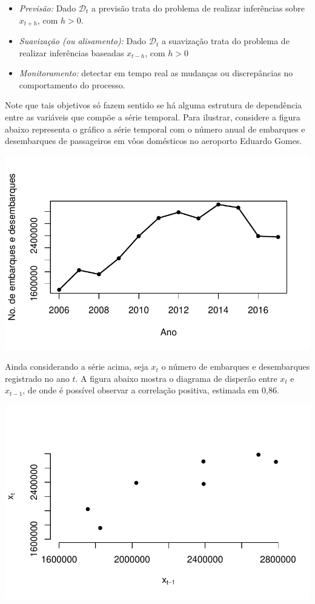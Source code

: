 \documentclass[
  letterpaper,
  DIV=11,
  numbers=noendperiod]{scrreprt}
\theoremstyle{definition}
\theoremstyle{plain}
\theoremstyle{definition}
\theoremstyle{plain}
\theoremstyle{remark}
\begin{document}
\begin{itemize}
\item
  \emph{Previsão:} Dado \(\mathcal{D}_t\) a previsão trata do problema
  de realizar inferências sobre \(x_{t+h}\), com \(h>0\).
\item
  \emph{Suavização (ou alisamento):} Dado \(\mathcal{D}_t\) a suavização
  trata do problema de realizar inferências baseadas \(x_{t-h}\), com
  \(h>0\)
\item
  \emph{Monitoramento:} detectar em tempo real as mudanças ou
  discrepâncias no comportamento do processo.
\end{itemize}

Note que tais objetivos só fazem sentido se há alguma estrutura de
dependência entre as variáveis que compõe a série temporal. Para
ilustrar, considere a figura abaixo representa o gráfico a série
temporal com o número anual de embarques e desembarques de passageiros
em vôos domésticos no aeroporto Eduardo Gomes.

\includegraphics{intro_files/figure-pdf/unnamed-chunk-1-1.pdf}

Ainda considerando a série acima, seja \(x_t\) o número de embarques e
desembarques registrado no ano \(t\). A figura abaixo mostra o diagrama
de disperão entre \(x_t\) e \(x_{t-1}\), de onde é possível observar a
correlação positiva, estimada em 0,86.

\includegraphics{intro_files/figure-pdf/unnamed-chunk-2-1.pdf}
\end{document}
